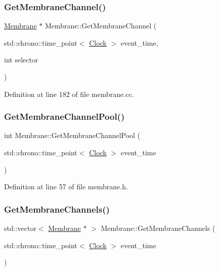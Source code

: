 \subsubsection{\texorpdfstring{Get\+Membrane\+Channel()}{GetMembraneChannel()}}
{\footnotesize\ttfamily \mbox{\hyperlink{class_membrane}{Membrane}} $\ast$ Membrane\+::\+Get\+Membrane\+Channel (\begin{DoxyParamCaption}\item[{std\+::chrono\+::time\+\_\+point$<$ \mbox{\hyperlink{universe_8h_a0ef8d951d1ca5ab3cfaf7ab4c7a6fd80}{Clock}} $>$}]{event\+\_\+time,  }\item[{int}]{selector }\end{DoxyParamCaption})}



Definition at line 182 of file membrane.\+cc.

\mbox{\label{class_membrane_a270278dd346edfe8c7bbd4c48929fdd5}} 
\subsubsection{\texorpdfstring{Get\+Membrane\+Channel\+Pool()}{GetMembraneChannelPool()}}
{\footnotesize\ttfamily int Membrane\+::\+Get\+Membrane\+Channel\+Pool (\begin{DoxyParamCaption}\item[{std\+::chrono\+::time\+\_\+point$<$ \mbox{\hyperlink{universe_8h_a0ef8d951d1ca5ab3cfaf7ab4c7a6fd80}{Clock}} $>$}]{event\+\_\+time }\end{DoxyParamCaption})\hspace{0.3cm}{\ttfamily [inline]}}



Definition at line 57 of file membrane.\+h.

\mbox{\label{class_membrane_a7fac2929241b7ff9b8b7f1ec955b2cc5}} 
\subsubsection{\texorpdfstring{Get\+Membrane\+Channels()}{GetMembraneChannels()}}
{\footnotesize\ttfamily std\+::vector$<$ \mbox{\hyperlink{class_membrane}{Membrane}} $\ast$ $>$ Membrane\+::\+Get\+Membrane\+Channels (\begin{DoxyParamCaption}\item[{std\+::chrono\+::time\+\_\+point$<$ \mbox{\hyperlink{universe_8h_a0ef8d951d1ca5ab3cfaf7ab4c7a6fd80}{Clock}} $>$}]{event\+\_\+time }\end{DoxyParamCaption})}



